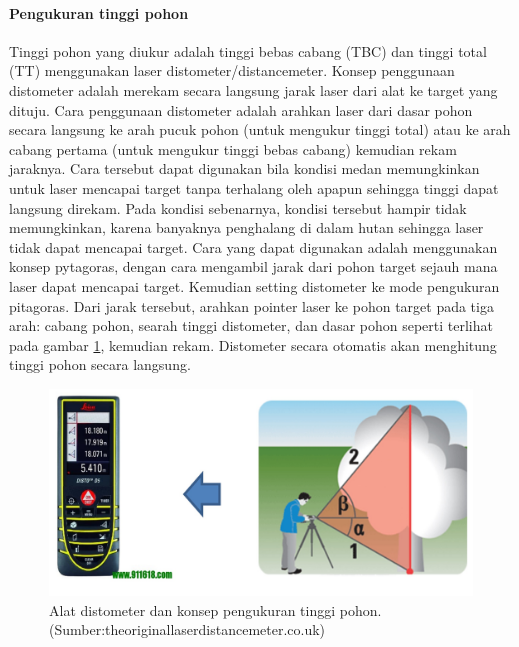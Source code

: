\documentclass[
]{book}
\begin{document}
\begin{longtable}[]{@{}
  >{\raggedright\arraybackslash}p{}
  >{\raggedright\arraybackslash}p{}@{}}
\bottomrule()
\end{longtable}

\hypertarget{pengukuran-tinggi-pohon}{%
\paragraph*{Pengukuran tinggi pohon}\label{pengukuran-tinggi-pohon}}

Tinggi pohon yang diukur adalah tinggi bebas cabang (TBC) dan tinggi total (TT) menggunakan laser distometer/distancemeter. Konsep penggunaan distometer adalah merekam secara langsung jarak laser dari alat ke target yang dituju. Cara penggunaan distometer adalah arahkan laser dari dasar pohon secara langsung ke arah pucuk pohon (untuk mengukur tinggi total) atau ke arah cabang pertama (untuk mengukur tinggi bebas cabang) kemudian rekam jaraknya. Cara tersebut dapat digunakan bila kondisi medan memungkinkan untuk laser mencapai target tanpa terhalang oleh apapun sehingga tinggi dapat langsung direkam. Pada kondisi sebenarnya, kondisi tersebut hampir tidak memungkinkan, karena banyaknya penghalang di dalam hutan sehingga laser tidak dapat mencapai target. Cara yang dapat digunakan adalah menggunakan konsep pytagoras, dengan cara mengambil jarak dari pohon target sejauh mana laser dapat mencapai target. Kemudian setting distometer ke mode pengukuran pitagoras. Dari jarak tersebut, arahkan pointer laser ke pohon target pada tiga arah: cabang pohon, searah tinggi distometer, dan dasar pohon seperti terlihat pada gambar \ref{fig:figdst}, kemudian rekam. Distometer secara otomatis akan menghitung tinggi pohon secara langsung.

\begin{figure}

{\centering \includegraphics[width=1\linewidth]{images/dst_ilustration} 

}

\caption{Alat distometer dan konsep pengukuran tinggi pohon. (Sumber:theoriginallaserdistancemeter.co.uk)}\label{fig:figdst}
\end{figure}
\end{document}
